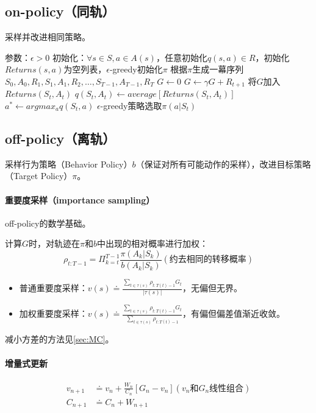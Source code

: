 \documentclass[
12pt, %
a4paper, 
oneside, %
headinclude,footinclude, %
]{scrartcl}
\begin{document}
\subsection[on-policy]{on-policy（同轨）}
采样并改进相同策略。
\begin{myalgorithm}
\State 参数：$ \epsilon > 0 $
\State 初始化：$ \forall s \in S, a \in A(s) $，任意初始化$ q(s,a) \in R $，初始化$ Returns(s,a) $为空列表，$ \epsilon $-greedy初始化$ \pi $
\Loop
\State 根据$ \pi $生成一幕序列$ S_0, A_0, R_1, S_1, A_1, R_2, \dots, S_{T - 1}, A_{T - 1}, R_T $
\State $ G \gets 0 $
\State $ G \gets \gamma G + R_{t + 1} $
 
\State 将$ G $加入$ Returns(S_t,A_t) $
\State $ q(S_t, A_t) \gets average[Returns(S_t, A_t)] $
\State $ a^* \gets argmax_a q(S_t, a) $
\State $ \epsilon $-greedy策略选取$ \pi(a|S_t) $
\EndIf
\EndFor
\EndLoop
\end{myalgorithm}
\subsection[off-policy]{off-policy（离轨）}
采样行为策略（Behavior Policy）$ b $（保证对所有可能动作的采样），改进目标策略（Target Policy）$ \pi $。
\paragraph{重要度采样（importance sampling）}\label{sec:MC back}
off-policy的数学基础。

计算$ G $时，对轨迹在$ \pi $和$ b $中出现的相对概率进行加权：
$$ \rho_{t:T - 1} = \Pi_{k = t}^{T - 1} \frac{\pi(A_k|S_k)}{b(A_k|S_k)} (\text{约去相同的转移概率}) $$
\begin{itemize}
\item 普通重要度采样：$ v(s) \doteq \frac{\sum_{t \in \tau(s)} \rho_{t:T(t) - 1}G_t}{|\tau(s)|} $，无偏但无界。
\item 加权重要度采样：$ v(s) \doteq \frac{\sum_{t \in \tau(s)} \rho_{t:T(t) - 1}G_t}{\sum_{t \in \tau(s)} \rho_{t:T(t) - 1}} $，有偏但偏差值渐近收敛。
\end{itemize}

减小方差的方法见\ref{sec:MC}。
\paragraph{增量式更新}
\begin{align*}
v_{n + 1} &\doteq v_n + \frac{W_n}{C_n}[G_n - v_n] (v_n \text{和} G_n \text{线性组合}) \\
C_{n + 1} &\doteq C_n + W_{n + 1}
\end{align*}
\end{document}
